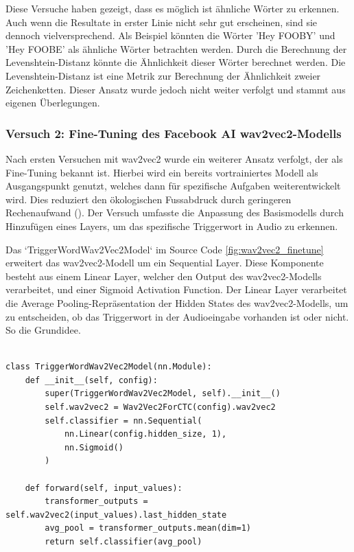 \documentclass[11pt,a4paper]{article}
\begin{document}
\noindent \newline
Diese Versuche haben gezeigt, dass es möglich ist ähnliche Wörter zu erkennen. Auch wenn die 
Resultate in erster Linie nicht sehr gut erscheinen, sind sie dennoch vielversprechend. Als 
Beispiel könnten die Wörter 'Hey FOOBY' und 'Hey FOOBE' als ähnliche Wörter betrachten werden. 
Durch die Berechnung der Levenshtein-Distanz könnte die Ähnlichkeit dieser Wörter berechnet werden.
Die Levenshtein-Distanz ist eine Metrik zur Berechnung der Ähnlichkeit zweier Zeichenketten. Dieser 
Ansatz wurde jedoch nicht weiter verfolgt und stammt aus eigenen Überlegungen.

\subsubsection{Versuch 2: Fine-Tuning des Facebook AI wav2vec2-Modells}
Nach ersten Versuchen mit wav2vec2 wurde ein weiterer Ansatz verfolgt, der als Fine-Tuning bekannt 
ist. Hierbei wird ein bereits vortrainiertes Modell als Ausgangspunkt genutzt, welches dann für 
spezifische Aufgaben weiterentwickelt wird. Dies reduziert den ökologischen Fussabdruck durch 
geringeren Rechenaufwand (\cite{huggingface2023finetune}). Der Versuch umfasste die Anpassung des 
Basismodells durch Hinzufügen eines Layers, um das spezifische Triggerwort in Audio zu erkennen. 

\noindent \newline
Das `TriggerWordWav2Vec2Model` im Source Code \ref{fig:wav2vec2_finetune} erweitert das 
wav2vec2-Modell um ein Sequential Layer. Diese Komponente besteht aus einem Linear Layer, welcher 
den Output des wav2vec2-Modells verarbeitet, und einer Sigmoid Activation Function. Der Linear 
Layer verarbeitet die Average Pooling-Repräsentation der Hidden States des wav2vec2-Modells, um zu 
entscheiden, ob das Triggerwort in der Audioeingabe vorhanden ist oder nicht. So die Grundidee.

\begin{lstlisting}[caption={TriggerWordWav2Vec2Model}, label=fig:wav2vec2_finetune]

class TriggerWordWav2Vec2Model(nn.Module):
	def __init__(self, config):
		super(TriggerWordWav2Vec2Model, self).__init__()
		self.wav2vec2 = Wav2Vec2ForCTC(config).wav2vec2
		self.classifier = nn.Sequential(
			nn.Linear(config.hidden_size, 1),
			nn.Sigmoid()
		)

	def forward(self, input_values):
		transformer_outputs = self.wav2vec2(input_values).last_hidden_state
		avg_pool = transformer_outputs.mean(dim=1)
		return self.classifier(avg_pool)

\end{lstlisting}
\end{document}
